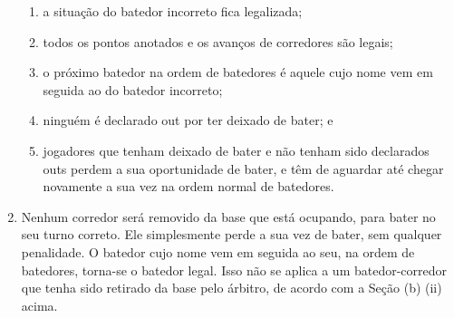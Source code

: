 \begin{enumerate}[label=(\alph*)]
	\begin{enumerate}[label=\roman*.]
		\item a situação do batedor incorreto fica legalizada;
		\item todos os pontos anotados e os avanços de corredores são legais;
		\item  o próximo batedor na ordem de batedores é aquele cujo nome vem em seguida ao do batedor incorreto;
		\item  ninguém é declarado \gls{out} por ter deixado de bater; e
		\item jogadores que tenham deixado de bater e não tenham sido declarados \gls{out}s perdem a sua oportunidade de bater, e têm de aguardar até chegar  novamente a sua vez na ordem normal de batedores.
	\end{enumerate}

	\item  Nenhum corredor será removido da base que está ocupando, para bater no seu turno correto. Ele simplesmente perde a sua vez de bater, sem qualquer  penalidade. O batedor cujo nome vem em seguida ao seu, na ordem de batedores, torna-se o batedor legal. Isso não se aplica a um batedor-corredor  que tenha sido retirado da base pelo árbitro, de acordo com a Seção (b) (ii) acima.

\end{enumerate}

